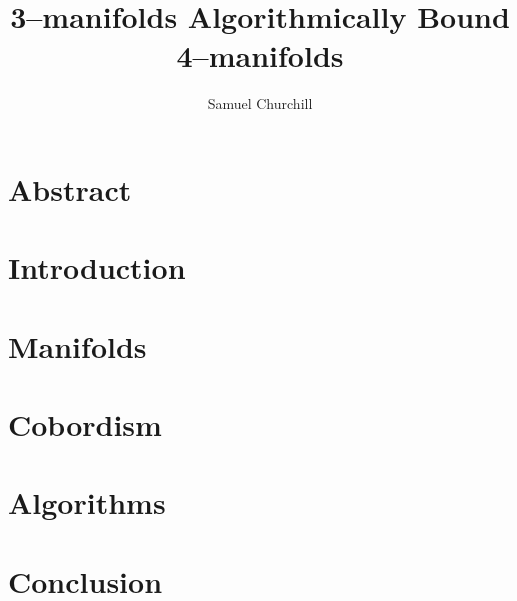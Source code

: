 \documentclass[12pt]{report}
\author{Samuel Churchill}
\title{3--manifolds Algorithmically Bound 4--manifolds}
\begin{document}
\maketitle

\chapter*{Abstract}


\tableofcontents
\listoffigures
\listofalgorithms


\chapter{Introduction}


\chapter{Manifolds}
\label{cha:manifolds}


\chapter{Cobordism}
\label{cha:cobordisms}


\chapter{Algorithms}
\label{cha:algorithm}


\chapter{Conclusion}



%

{}

\end{document}
